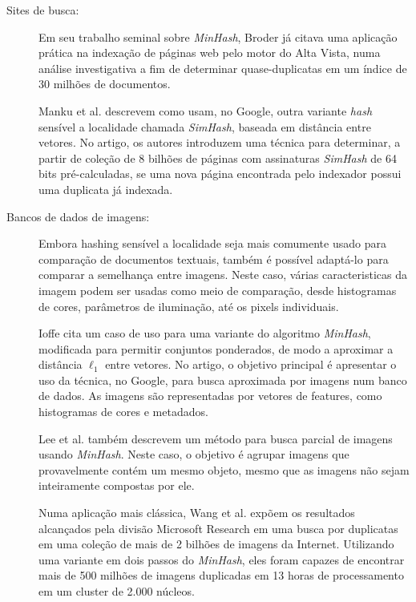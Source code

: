 \begin{description}

\item[Sites de busca:]

Em seu trabalho seminal sobre \emph{MinHash}, Broder \cite{broder1997resemblance} já citava uma aplicação prática na indexação de páginas web pelo motor do Alta Vista, numa análise investigativa a fim de determinar quase-duplicatas em um índice de 30 milhões de documentos.

Manku et al. \cite{manku2007detecting} descrevem como usam, no Google, outra variante \emph{hash} sensível a localidade chamada \emph{SimHash}, baseada em distância entre vetores. No artigo, os autores introduzem uma técnica para determinar, a partir de coleção de 8 bilhões de páginas com assinaturas \emph{SimHash} de 64 bits pré-calculadas, se uma nova página encontrada pelo indexador possui uma duplicata já indexada.

\item[Bancos de dados de imagens:]

Embora hashing sensível a localidade seja mais comumente usado para comparação de documentos textuais, também é possível adaptá-lo para comparar a semelhança entre imagens. Neste caso, várias caracteristicas da imagem podem ser usadas como meio de comparação, desde histogramas de cores, parâmetros de iluminação, até os pixels individuais.

Ioffe \cite{ioffe2010improved} cita um caso de uso para uma variante do algoritmo \emph{MinHash}, modificada para permitir conjuntos ponderados, de modo a aproximar a distância $\ell_1$ entre vetores. No artigo, o objetivo principal é apresentar o uso da técnica, no Google, para busca aproximada por imagens num banco de dados. As imagens são representadas por vetores de features, como histogramas de cores e metadados. 

Lee et al. \cite{lee2010partition} também descrevem um método para busca parcial de imagens usando \emph{MinHash}. Neste caso, o objetivo é agrupar imagens que provavelmente contém um mesmo objeto, mesmo que as imagens não sejam inteiramente compostas por ele.

Numa aplicação mais clássica, Wang et al. \cite{wang2013duplicate} expõem os resultados alcançados pela divisão Microsoft Research em uma busca por duplicatas em uma coleção de mais de 2 bilhões de imagens da Internet. Utilizando uma variante em dois passos do \emph{MinHash}, eles foram capazes de encontrar mais de 500 milhões de imagens duplicadas em 13 horas de processamento em um cluster de 2.000 núcleos.


\end{description}

